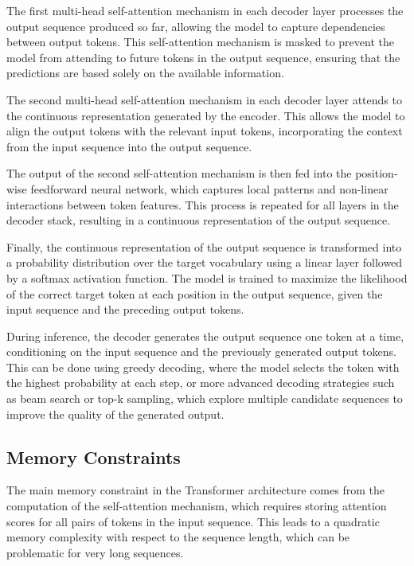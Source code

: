 \documentclass[12pt]{article}
\begin{document}
The first multi-head self-attention mechanism in each decoder layer processes the output sequence produced so far, allowing the model to capture dependencies between output tokens. This self-attention mechanism is masked to prevent the model from attending to future tokens in the output sequence, ensuring that the predictions are based solely on the available information.

The second multi-head self-attention mechanism in each decoder layer attends to the continuous representation generated by the encoder. This allows the model to align the output tokens with the relevant input tokens, incorporating the context from the input sequence into the output sequence.

The output of the second self-attention mechanism is then fed into the position-wise feedforward neural network, which captures local patterns and non-linear interactions between token features. This process is repeated for all layers in the decoder stack, resulting in a continuous representation of the output sequence.

Finally, the continuous representation of the output sequence is transformed into a probability distribution over the target vocabulary using a linear layer followed by a softmax activation function. The model is trained to maximize the likelihood of the correct target token at each position in the output sequence, given the input sequence and the preceding output tokens.

During inference, the decoder generates the output sequence one token at a time, conditioning on the input sequence and the previously generated output tokens. This can be done using greedy decoding, where the model selects the token with the highest probability at each step, or more advanced decoding strategies such as beam search or top-k sampling, which explore multiple candidate sequences to improve the quality of the generated output.

\subsection{Memory Constraints}

The main memory constraint in the Transformer architecture comes from the computation of the self-attention mechanism, which requires storing attention scores for all pairs of tokens in the input sequence. This leads to a quadratic memory complexity with respect to the sequence length, which can be problematic for very long sequences.
\end{document}
